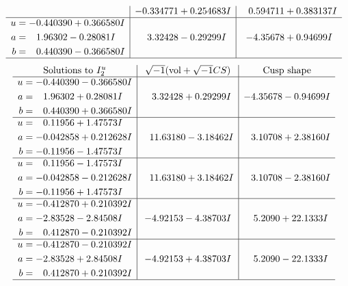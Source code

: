 \documentclass[1p]{elsarticle_modified}
\theoremstyle{definition}
\newcommand{\I}{\sqrt{-1}}
\begin{document}
$$\begin{array}{c|c|c}
 & -0.334771 + 0.254683 I & \phantom{-}0.594711 + 0.383137 I \\ \hline\begin{aligned}
u &= -0.440390 + 0.366580 I \\
a &= \phantom{-}1.96302 - 0.28081 I \\
b &= \phantom{-}0.440390 - 0.366580 I\end{aligned}
 & \phantom{-}3.32428 - 0.29299 I & -4.35678 + 0.94699 I\\
 \hline 
 \end{array}$$\newpage$$\begin{array}{c|c|c}  
\text{Solutions to }I^u_{2}& \I (\text{vol} + \sqrt{-1}CS) & \text{Cusp shape}\\
 \hline 
\begin{aligned}
u &= -0.440390 - 0.366580 I \\
a &= \phantom{-}1.96302 + 0.28081 I \\
b &= \phantom{-}0.440390 + 0.366580 I\end{aligned}
 & \phantom{-}3.32428 + 0.29299 I & -4.35678 - 0.94699 I \\ \hline\begin{aligned}
u &= \phantom{-}0.11956 + 1.47573 I \\
a &= -0.042858 + 0.212628 I \\
b &= -0.11956 - 1.47573 I\end{aligned}
 & \phantom{-}11.63180 - 3.18462 I & \phantom{-}3.10708 + 2.38160 I \\ \hline\begin{aligned}
u &= \phantom{-}0.11956 - 1.47573 I \\
a &= -0.042858 - 0.212628 I \\
b &= -0.11956 + 1.47573 I\end{aligned}
 & \phantom{-}11.63180 + 3.18462 I & \phantom{-}3.10708 - 2.38160 I \\ \hline\begin{aligned}
u &= -0.412870 + 0.210392 I \\
a &= -2.83528 - 2.84508 I \\
b &= \phantom{-}0.412870 - 0.210392 I\end{aligned}
 & -4.92153 - 4.38703 I & \phantom{-}5.2090 + 22.1333 I \\ \hline\begin{aligned}
u &= -0.412870 - 0.210392 I \\
a &= -2.83528 + 2.84508 I \\
b &= \phantom{-}0.412870 + 0.210392 I\end{aligned}
 & -4.92153 + 4.38703 I & \phantom{-}5.2090 - 22.1333 I\\
 \hline 
 \end{array}$$\newpage\newpage\renewcommand{\arraystretch}{1}
\end{document}
